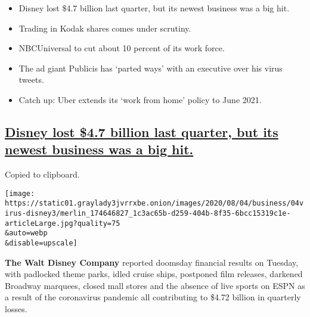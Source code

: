 \begin{itemize}
\item
  \protect\hyperlink{disney-lost-4-7-billion-last-quarter-but-its-newest-business-was-a-big-hit}{}

  Disney lost \$4.7 billion last quarter, but its newest business was a
  big hit.
\item
  \protect\hyperlink{trading-in-kodak-shares-comes-under-scrutiny}{}

  Trading in Kodak shares comes under scrutiny.
\item
  \protect\hyperlink{nbcuniversal-to-cut-about-10-percent-of-its-work-force}{}

  NBCUniversal to cut about 10 percent of its work force.
\item
  \protect\hyperlink{the-ad-giant-publicis-has-parted-ways-with-an-executive-over-his-virus-tweets}{}

  The ad giant Publicis has `parted ways' with an executive over his
  virus tweets.
\item
  \protect\hyperlink{catch-up-uber-extends-its-work-from-home-policy-to-june-2021}{}

  Catch up: Uber extends its `work from home' policy to June 2021.
\end{itemize}

\hypertarget{disney-lost-47-billion-last-quarter-but-its-newest-business-was-a-big-hit}{%
\subsection{\texorpdfstring{\protect\hyperlink{disney-lost-4-7-billion-last-quarter-but-its-newest-business-was-a-big-hit}{Disney
lost \$4.7 billion last quarter, but its newest business was a big
hit.}}{Disney lost \$4.7 billion last quarter, but its newest business was a big hit.}}\label{disney-lost-47-billion-last-quarter-but-its-newest-business-was-a-big-hit}}

Copied to clipboard.

\texttt{[image: https://static01.graylady3jvrrxbe.onion/images/2020/08/04/business/04virus-disney3/merlin\_174646827\_1c3ac65b-d259-404b-8f35-6bcc15319c1e-articleLarge.jpg?quality=75\\\&auto=webp\\\&disable=upscale]}

\textbf{The Walt Disney Company} reported doomsday financial results on
Tuesday, with padlocked theme parks, idled cruise ships, postponed film
releases, darkened Broadway marquees, closed mall stores and the absence
of live sports on ESPN as a result of the coronavirus pandemic all
contributing to \$4.72 billion in quarterly losses.

